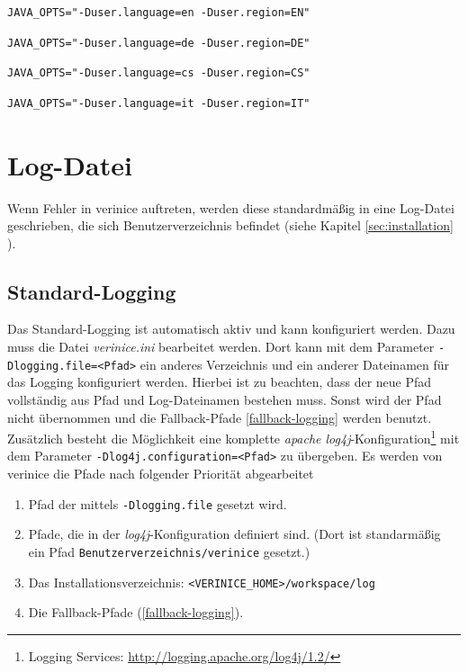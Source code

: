 \documentclass[a4paper,10pt]{book}
\begin{document}
\begin{lstlisting}[language=Plain, caption={tomcat.conf Englisch}]
JAVA_OPTS="-Duser.language=en -Duser.region=EN"
\end{lstlisting}

\begin{lstlisting}[language=Plain, caption={tomcat.conf Deutsch}]
JAVA_OPTS="-Duser.language=de -Duser.region=DE"
\end{lstlisting}

\begin{lstlisting}[language=Plain, caption={tomcat.conf Tschechisch}]
JAVA_OPTS="-Duser.language=cs -Duser.region=CS"
\end{lstlisting}

\begin{lstlisting}[language=Plain, caption={tomcat.conf Italienisch}]
JAVA_OPTS="-Duser.language=it -Duser.region=IT"
\end{lstlisting}

\section{Log-Datei}
\label{sec:log-datei}

Wenn Fehler in verinice auftreten, werden diese standardmäßig in eine
Log-Datei geschrieben, die sich Benutzerverzeichnis befindet (siehe
Kapitel \ref{sec:installation} ).


\subsection{Standard-Logging}
\label{sec:standard-logging}

Das Standard-Logging ist automatisch aktiv und kann konfiguriert
werden. Dazu muss die Datei \textit{verinice.ini} bearbeitet
werden. Dort kann mit dem Para\-meter \texttt{-Dlogging.file=<Pfad>}
ein anderes Verzeichnis und ein anderer Dateinamen für das Logging
konfiguriert werden. Hierbei ist zu beachten, dass der neue Pfad
vollständig aus Pfad und Log-Dateinamen bestehen muss. Sonst wird der
Pfad nicht übernommen und die Fallback-Pfade \ref{fallback-logging}
werden benutzt.\\

Zusätzlich besteht die Möglichkeit eine komplette \textit{apache
  log4j}-Konfiguration\footnote{Logging Services:
  \url{http://logging.apache.org/log4j/1.2/}} mit dem Parameter
\texttt{-Dlog4j.configuration=<Pfad>} zu übergeben. Es werden von
verinice die Pfade nach folgender Priorität abgearbeitet
\begin{enumerate}
\item Pfad der mittels \texttt{-Dlogging.file} gesetzt wird.
\item Pfade, die in der \textit{log4j}-Konfiguration definiert
  sind. (Dort ist standarmäßig ein Pfad
  \texttt{Benutzerverzeichnis/verinice} gesetzt.)
\item Das Installationsverzeichnis: \texttt{<VERINICE\_HOME>/workspace/log}
\item Die Fallback-Pfade (\ref{fallback-logging}).
\end{enumerate}
\end{document}
